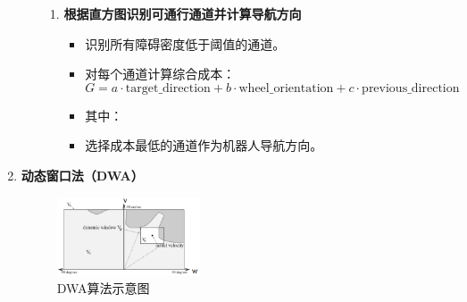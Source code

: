 \documentclass[../main.tex]{subfiles}
\begin{document}
\begin{enumerate}
\begin{itemize}
\begin{enumerate}
                    \item \textbf{根据直方图识别可通行通道并计算导航方向}  
                        \begin{itemize}
                            \item {\small\kaishu 识别所有障碍密度低于阈值的通道。}  
                            \item {\small\kaishu 对每个通道计算综合成本：  }
                                \[
                                G = a \cdot \text{target\_direction} + b \cdot \text{wheel\_orientation} + c \cdot \text{previous\_direction}
                                \]
                            \item {\small\kaishu 其中：}
                            \item {\small\kaishu 选择成本最低的通道作为机器人导航方向。  }
                        \end{itemize}
                \end{enumerate}
        \end{itemize}
    \item \textbf{动态窗口法（DWA）}\label{dynamicwindow}
        \begin{figure}[H]
            \centering
            \includegraphics[width=0.4\textwidth]{images/dwa.png}
            \caption{DWA算法示意图}
        \end{figure}
\end{enumerate}
\end{document}
